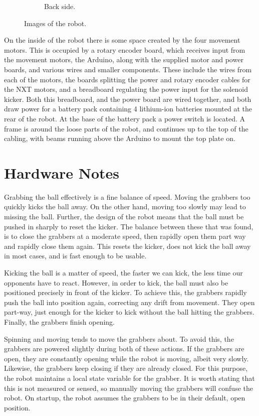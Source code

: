 \begin{figure}[!tbp]
\begin{subfigure}[b]{0.4\textwidth}
    \caption{Back side.}
    \label{fig:f2}
  \end{subfigure}
  \caption{Images of the robot.}
\end{figure}

On the inside of the robot there is some space created by the four movement
motors. This is occupied by a rotary encoder board, which receives input from
the movement motors, the Arduino, along with the supplied motor and power
boards, and various wires and smaller components. These include the wires from
each of the motors, the boards splitting the power and rotary encoder cables
for the NXT motors, and a breadboard regulating the power input for the
solenoid kicker. Both this breadboard, and the power board are wired together,
and both draw power for a battery pack containing 4 lithium-ion batteries
mounted at the rear of the robot. At the base of the battery pack a power
switch is located. A frame is around the loose parts of the robot, and
continues up to the top of the cabling, with beams running above the Arduino to
mount the top plate on.

\section{Hardware Notes}

Grabbing the ball effectively is a fine balance of speed. Moving the grabbers
too quickly kicks the ball away. On the other hand, moving too slowly may lead
to missing the ball. Further, the design of the robot means that the ball must
be pushed in sharply to reset the kicker. The balance between these that was
found, is to close the grabbers at a moderate speed, then rapidly open them
part way and rapidly close them again. This resets the kicker, does not kick
the ball away in most cases, and is fast enough to be usable.

Kicking the ball is a matter of speed, the faster we can kick, the less time
our opponents have to react. However, in order to kick, the ball must also be
positioned precisely in front of the kicker. To achieve this, the grabbers
rapidly push the ball into position again, correcting any drift from movement.
They open part-way, just enough for the kicker to kick without the ball
hitting the grabbers. Finally, the grabbers finish opening.

Spinning and moving tends to move the grabbers about. To avoid this, the
grabbers are powered slightly during both of these actions. If the grabbers are
open, they are constantly opening while the robot is moving, albeit very
slowly. Likewise, the grabbers keep closing if they are already closed. For
this purpose, the robot maintains a local state variable for the grabber. It is
worth stating that this is not measured or sensed, so manually moving the
grabbers will confuse the robot. On startup, the robot assumes the grabbers to
be in their default, open position.
